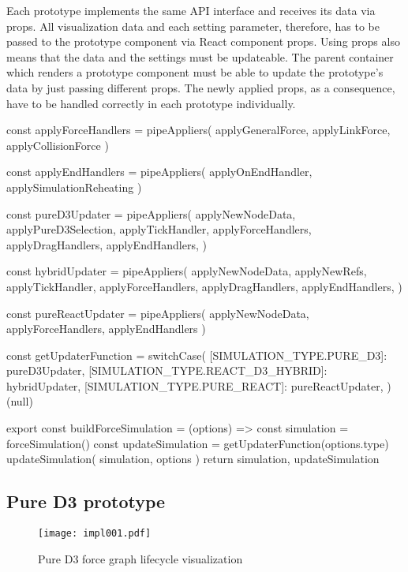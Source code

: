 Each prototype implements the same API interface and receives its data via props. All visualization data and each setting parameter, therefore, has to be passed to the prototype component via React component props. Using props also means that the data and the settings must be updateable. The parent container which renders a prototype component must be able to update the prototype's data by just passing different props. The newly applied props, as a consequence, have to be handled correctly in each prototype individually.

\begin{program}[H]
\caption{Simple example of a React component and its usage} 
\label{prog:forceBuildModule}
\begin{JsCode}
const applyForceHandlers = pipeAppliers(
  applyGeneralForce, 
  applyLinkForce, 
  applyCollisionForce
)

const applyEndHandlers = pipeAppliers(
  applyOnEndHandler, 
  applySimulationReheating
)

const pureD3Updater = pipeAppliers(
  applyNewNodeData,
  applyPureD3Selection,
  applyTickHandler,
  applyForceHandlers,
  applyDragHandlers,
  applyEndHandlers,
)

const hybridUpdater = pipeAppliers(
  applyNewNodeData,
  applyNewRefs,
  applyTickHandler,
  applyForceHandlers,
  applyDragHandlers,
  applyEndHandlers,
)

const pureReactUpdater = pipeAppliers(
  applyNewNodeData, 
  applyForceHandlers, 
  applyEndHandlers
)

const getUpdaterFunction = switchCase({
  [SIMULATION_TYPE.PURE_D3]: pureD3Updater,
  [SIMULATION_TYPE.REACT_D3_HYBRID]: hybridUpdater,
  [SIMULATION_TYPE.PURE_REACT]: pureReactUpdater,
})(null)

export const buildForceSimulation = (options) => {
  const simulation = forceSimulation()
  const updateSimulation = getUpdaterFunction(options.type)
  updateSimulation({ simulation, options })
  return { simulation, updateSimulation }
}
\end{JsCode}
\end{program}


\subsection{Pure D3 prototype}

\begin{figure}
\centering
\texttt{[image: impl001.pdf]}
\caption{Pure D3 force graph lifecycle visualization}
\label{fig:pureD3Lifecycle}
\end{figure}


